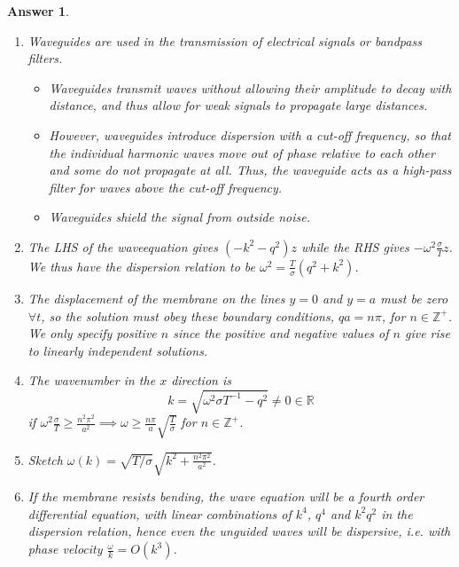 \documentclass[a4paper]{article}
\newtheorem{ans}{Answer}[subsection]
\theoremstyle{new}
\begin{document}
\begin{ans}\leavevmode
\begin{enumerate}[label=(\alph*)]
\item Waveguides are used in the transmission of electrical signals or bandpass filters.
\begin{itemize}
    \item Waveguides transmit waves without allowing their amplitude to decay with distance, and thus allow for weak signals to propagate large distances.
    \item However, waveguides introduce dispersion with a cut-off frequency, so that the individual harmonic waves move out of phase relative to each other and some do not propagate at all. Thus, the waveguide acts as a high-pass filter for waves above the cut-off frequency.
    \item Waveguides shield the signal from outside noise.
\end{itemize}
\item The LHS of the waveequation gives $(-k^2-q^2)z$ while the RHS gives $-\omega^2\frac{\sigma}{T}z$. We thus have the dispersion relation to be $\omega^2=\frac{T}{\sigma}(q^2+k^2)$.
\item The displacement of the membrane on the lines $y=0$ and $y=a$ must be zero $\forall t$, so the solution must obey these boundary conditions, $qa=n\pi$, for $n\in\mathbb{Z}^+$. We only specify positive $n$ since the positive and negative values of $n$ give rise to linearly independent solutions.
\item The wavenumber in the $x$ direction is
$$k=\sqrt{\omega^2\sigma T^{-1}-q^2}\neq 0\in\mathbb{R}$$
if $\omega^2\frac{\sigma}{T}\geq\frac{n^2\pi^2}{a^2}\implies\omega\geq\frac{n\pi}{a}\sqrt{\frac{T}{\sigma}}$ for $n\in\mathbb{Z}^+$.
\item Sketch $\omega(k)=\sqrt{T/\sigma}\sqrt{k^2+\frac{n^2\pi^2}{a^2}}$.
\begin{center}
\end{center}
\item If the membrane resists bending, the wave equation will be a fourth order differential equation, with linear combinations of $k^4$, $q^4$ and $k^2q^2$ in the dispersion relation, hence even the unguided waves will be dispersive, i.e. with phase velocity $\frac{\omega}{k}=O(k^3)$.
\end{enumerate}
\end{ans}
\newpage
\end{document}

